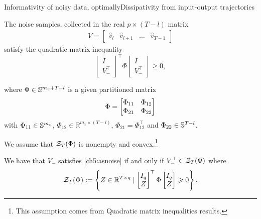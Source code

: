 \documentclass[aspectratio=169, handout, 10pt, hyperref=colorlinks]{beamer}
\begin{document}
\begin{frame}[allowframebreaks]{Informativity of noisy data, optimally}{Dissipativity from input-output trajectories}
    \begin{definition} \label{ch5:assumption on noise samples}
    The noise samples,
    collected in the real $p \times (T-l)$ matrix
    \begin{align}
    V = \begin{bmatrix} \hat{v}_{l} & \hat{v}_{l+1}  & \dots & \hat{v}_{T-1} \end{bmatrix}
    \label{eq:vhat}
    \end{align}
    satisfy the quadratic matrix inequality
    \begin{equation} 
        \label{ch5:asnoise}
        \begin{bmatrix}
        I \\ V_-^\top 
        \end{bmatrix}^\top 
        \Phi
        \begin{bmatrix}
        I \\ V_-^\top 
        \end{bmatrix} \geq 0,
    \end{equation}
    \end{definition}
    \begin{definition}    
    where $\Phi \in \S{m_v + T-l}$ is a given partitioned matrix 
    \begin{equation} \label{ch5:eq:Phi}
    \Phi = \bbm \Phi_{11}  & \Phi_{12} \\ \Phi_{21} & \Phi_{22} \ebm
    \end{equation}
    with $\Phi_{11} \in \S{m_v}$, $\Phi_{12} \in \mathbb{R}^{m_v \times (T-l)}$, $\Phi_{21} = \Phi_{12}^\top$ and $\Phi_{22} \in \S{T-l}$.

    We assume that $\calZ_T(\Phi)$ is nonempty and convex.\footnote{\tiny{This assumption comes from Quadratic matrix inequalities results.}}

    We have that $V_-$ satisfies \eqref{ch5:asnoise} if and only if $V_-^\top \in \calZ_T(\Phi)$ where
    \begin{equation} \label{ch0:e:Zr}
    \calZ_{T}(\Phi):=\left\{ Z\in\R^{T\times q} \mid \bbm I_q\\Z\ebm^\top\Phi\bbm I_q\\Z\ebm\geq 0\right\},
    \end{equation}
    \end{definition}


\end{frame}
\end{document}
